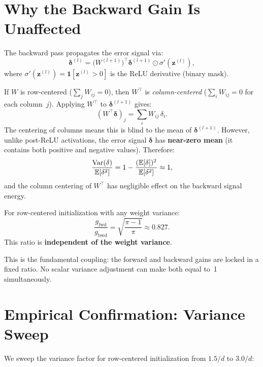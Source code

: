 \section{Why the Backward Gain Is Unaffected}
\label{sec:bwd_gain}

The backward pass propagates the error signal via:
\begin{equation}\label{eq:backward}
  \bm{\delta}^{(l)}
  = \bigl(W^{(l+1)}\bigr)^\top \bm{\delta}^{(l+1)}
    \odot \sigma'(\bm{z}^{(l)}),
\end{equation}
where $\sigma'(\bm{z}^{(l)}) = \mathbf{1}[\bm{z}^{(l)} > 0]$ is the
ReLU derivative (binary mask).

If $W$ is row-centered ($\sum_j W_{ij} = 0$), then $W^\top$ is
\emph{column-centered} ($\sum_i W_{ij} = 0$ for each column~$j$).
Applying $W^\top$ to $\bm{\delta}^{(l+1)}$ gives:
\[
  (W^\top \bm{\delta})_j = \sum_i W_{ij}\,\delta_i.
\]
The centering of columns means this is blind to the mean of
$\bm{\delta}^{(l+1)}$.  However, unlike post-ReLU activations, the
error signal $\bm{\delta}$ has \textbf{near-zero mean} (it contains
both positive and negative values).  Therefore:
\[
  \frac{\operatorname{Var}(\delta)}{\mathbb{E}[\delta^2]}
  = 1 - \frac{(\mathbb{E}[\delta])^2}{\mathbb{E}[\delta^2]}
  \approx 1,
\]
and the column centering of $W^\top$ has negligible effect on the
backward signal energy.

\begin{proposition}
\label{prop:fb_ratio}
For row-centered initialization with any weight variance:
\begin{equation}\label{eq:fb_ratio}
  \frac{g_{\mathrm{fwd}}}{g_{\mathrm{bwd}}}
  = \sqrt{\frac{\pi-1}{\pi}}
  \approx 0.827.
\end{equation}
This ratio is \textbf{independent of the weight variance}.
\end{proposition}

This is the fundamental coupling: the forward and backward gains
are locked in a fixed ratio.  No scalar variance adjustment can make
both equal to~1 simultaneously.

\section{Empirical Confirmation: Variance Sweep}
\label{sec:var_sweep}

We sweep the variance factor for row-centered initialization from
$1.5/d$ to $3.0/d$:

